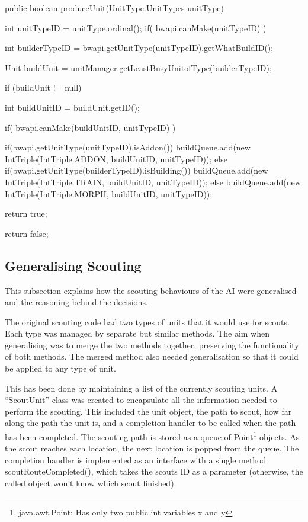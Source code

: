 \documentclass[11pt,openright,a4paper]{report}
\begin{document}
\begin{Code}[frame=single,language=Java,tabsize=4,breaklines,breakatwhitespace,caption={The current method to produce any unit in the game. IntTriple is a custom type that simply contains three public integers.},label=produceUnit]
public boolean produceUnit(UnitType.UnitTypes unitType){
	int unitTypeID = unitType.ordinal();
	if( bwapi.canMake(unitTypeID) ){
		int builderTypeID = bwapi.getUnitType(unitTypeID).getWhatBuildID();
		
        Unit buildUnit = unitManager.getLeastBusyUnitofType(builderTypeID);
		
		if (buildUnit != null){
			int buildUnitID = buildUnit.getID();
			
			if( bwapi.canMake(buildUnitID, unitTypeID) ){					
				if(bwapi.getUnitType(unitTypeID).isAddon()){
					buildQueue.add(new IntTriple(IntTriple.ADDON, buildUnitID, unitTypeID));
				}
				else if(bwapi.getUnitType(builderTypeID).isBuilding()){
					buildQueue.add(new IntTriple(IntTriple.TRAIN, buildUnitID, unitTypeID));
				}
				else{
					buildQueue.add(new IntTriple(IntTriple.MORPH, buildUnitID, unitTypeID));
				}
				
				return true;
			}
		}
	}
	return false;
}
\end{Code}

\subsection{Generalising Scouting}
This subsection explains how the scouting behaviours of the AI were generalised and the reasoning behind the decisions.

The original scouting code had two types of units that it would use for scouts. Each type was managed by separate but similar methods. The aim when generalising was to merge the two methods together, preserving the functionality of both methods. The merged method also needed generalisation so that it could be applied to any type of unit. 

This has been done by maintaining a list of the currently scouting units. A ``ScoutUnit'' class was created to encapsulate all the information needed to perform the scouting. This included the unit object, the path to scout, how far along the path the unit is, and a completion handler to be called when the path has been completed. The scouting path is stored as a queue of Point\footnote{java.awt.Point: Has only two public int variables x and y} objects. As the scout reaches each location, the next location is popped from the queue. The completion handler is implemented as an interface with a single method scoutRouteCompleted(), which takes the scouts ID as a parameter (otherwise, the called object won't know which scout finished).
\end{document}
